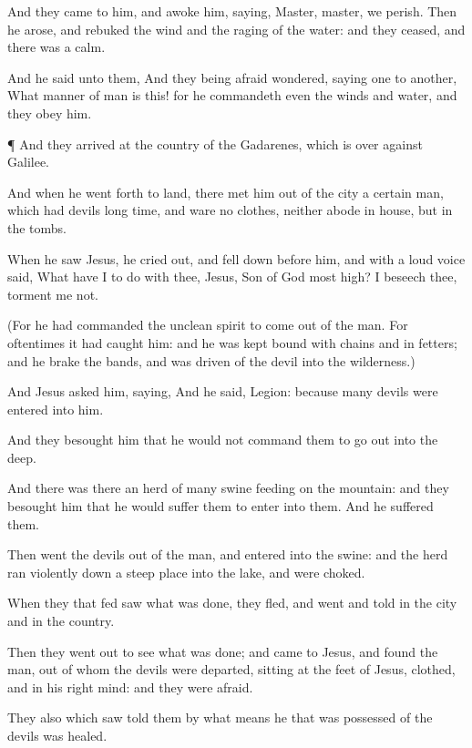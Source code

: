 {And they came to
him, and
awoke
him,
saying,
Master,
master, we
perish.
Then he
arose, and
rebuked the
wind
and the
raging of the
water:
and they
ceased,
and there
was a
calm.

And he
said unto
them,
{}
And they being
afraid
wondered,
saying
one
to
another,
What manner of
man
is
this!
for he
commandeth
even the
winds
and
water,
and they
obey
him.


\par }{\PP {}¶
And they
arrived
at the
country of the
Gadarenes,
which
is over
against
Galilee.

And
when
he
went
forth to
land, there
met
him out
of the
city a
certain
man,
which
had
devils
long
time,
and
ware
no
clothes,
neither
abode
in
{}
house,
but
in the
tombs.

When he
saw
Jesus, he cried
out, and fell
down before
him,
and with a
loud
voice
said,
What have
I to
do with
thee,
Jesus,
{}
Son of
God most
high? I
beseech
thee,
torment
me
not.

(For he had
commanded the
unclean
spirit to come
out
of the
man.
For
oftentimes it had
caught
him:
and he was
kept
bound with
chains
and in
fetters;
and he
brake the
bands, and was
driven
of the
devil
into the
wilderness.)

And
Jesus
asked
him,
saying,
{}
And he
said,
Legion:
because
many
devils were
entered
into
him.

And they
besought
him
that he
would
not
command
them to go
out
into the
deep.

And there
was
there an
herd of
many
swine
feeding
on the
mountain:
and they
besought
him
that he would
suffer
them to
enter
into
them.
And he
suffered
them.

Then
went the
devils out
of the
man, and
entered
into the
swine:
and the
herd ran
violently
down a steep
place
into the
lake,
and were
choked.

When they that
fed
{}
saw what was
done, they
fled,
and
went and
told
{}
in the
city
and
in the
country.

Then they went
out to
see what was
done;
and
came
to
Jesus,
and
found the
man, out
of
whom the
devils were
departed,
sitting
at the
feet of
Jesus,
clothed,
and in his right
mind:
and they were
afraid.

They
also
which
saw
{}
told them by what
means he that was possessed of the
devils was
healed.


}
